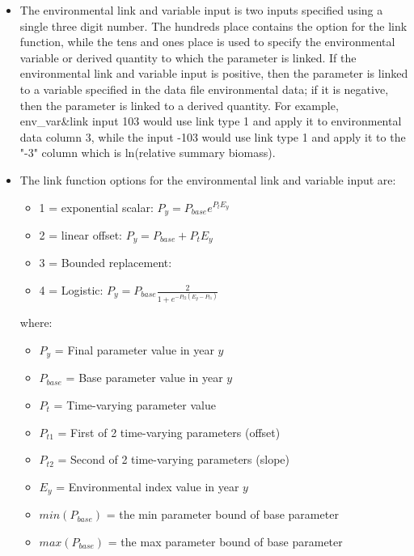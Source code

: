 \begin{itemize}
	\begin{itemize}
	   \item The environmental link and variable input is two inputs specified using a single three digit number. The hundreds place contains the option for the link function, while the tens and ones place is used to specify the environmental variable or derived quantity to which the parameter is linked. If the environmental link and variable input is positive, then the parameter is linked to a variable specified in the data file environmental data; if it is negative, then the parameter is linked to a derived quantity. For example, env\_var\&link input 103 would use link type 1 and apply it to environmental data column 3, while the input -103  would use link type 1 and apply it to the "-3" column which is ln(relative summary biomass).
	   \item The link function options for  the environmental link and variable input are:
	   \begin{itemize}
	       \item 1 = exponential scalar: $P_{y} = P_{base}e^{P_{t}E_{y}}$
		   \item 2 = linear offset: $P_{y} = P_{base} + P_{t}E_{y}$
		   \item 3 = Bounded replacement: %
		   \item 4 = Logistic: $P_{y} = P_{base}\frac{2}{1+e^{-P_{t2}(E_{y}-P_{t1})}}$
	   \end{itemize}
		where:
	   \begin{itemize}
	       \item $P_{y}$ = Final parameter value in year $y$
           \item $P_{base}$ = Base parameter value in year $y$
           \item $P_{t}$ = Time-varying parameter value
           \item $P_{t1}$ = First of 2 time-varying parameters (offset)
           \item $P_{t2}$ = Second of 2 time-varying parameters (slope)
           \item $E_{y}$ = Environmental index value in year $y$
           \item $min(P_{base})$ = the min parameter bound of base parameter
           \item $max(P_{base})$ = the max parameter bound of base parameter
        \end{itemize}

\end{itemize}
\end{itemize}
